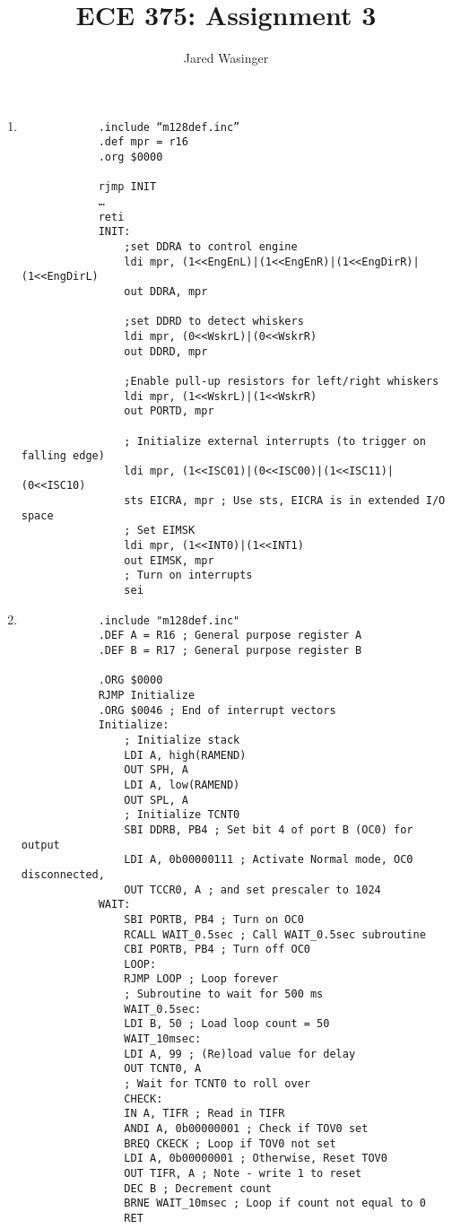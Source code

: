 \documentclass{article}
\begin{document}
  \title{ECE 375: Assignment 3}
  \author{Jared Wasinger}

  \maketitle

  \begin{enumerate}
		\item\begin{verbatim}
			.include “m128def.inc”
			.def mpr = r16
			.org $0000

			rjmp INIT
			…
			reti
			INIT: 
				;set DDRA to control engine
				ldi mpr, (1<<EngEnL)|(1<<EngEnR)|(1<<EngDirR)|(1<<EngDirL)
				out DDRA, mpr 

				;set DDRD to detect whiskers
				ldi mpr, (0<<WskrL)|(0<<WskrR)
				out DDRD, mpr 

				;Enable pull-up resistors for left/right whiskers
				ldi mpr, (1<<WskrL)|(1<<WskrR)
				out PORTD, mpr 

				; Initialize external interrupts (to trigger on falling edge)
				ldi mpr, (1<<ISC01)|(0<<ISC00)|(1<<ISC11)|(0<<ISC10)
				sts EICRA, mpr ; Use sts, EICRA is in extended I/O space
				; Set EIMSK
				ldi mpr, (1<<INT0)|(1<<INT1)
				out EIMSK, mpr
				; Turn on interrupts
				sei
		\end{verbatim}

		\item\begin{verbatim}
			.include "m128def.inc"
			.DEF A = R16 ; General purpose register A
			.DEF B = R17 ; General purpose register B

			.ORG $0000
			RJMP Initialize
			.ORG $0046 ; End of interrupt vectors
			Initialize:
				; Initialize stack
				LDI A, high(RAMEND)
				OUT SPH, A
				LDI A, low(RAMEND)
				OUT SPL, A
				; Initialize TCNT0
				SBI DDRB, PB4 ; Set bit 4 of port B (OC0) for output
				LDI A, 0b00000111 ; Activate Normal mode, OC0 disconnected,
				OUT TCCR0, A ; and set prescaler to 1024
			WAIT:
			 	SBI PORTB, PB4 ; Turn on OC0
				RCALL WAIT_0.5sec ; Call WAIT_0.5sec subroutine
				CBI PORTB, PB4 ; Turn off OC0
				LOOP:
				RJMP LOOP ; Loop forever
				; Subroutine to wait for 500 ms
				WAIT_0.5sec:
				LDI B, 50 ; Load loop count = 50
				WAIT_10msec:
				LDI A, 99 ; (Re)load value for delay
				OUT TCNT0, A
				; Wait for TCNT0 to roll over
				CHECK:
				IN A, TIFR ; Read in TIFR
				ANDI A, 0b00000001 ; Check if TOV0 set
				BREQ CKECK ; Loop if TOV0 not set
				LDI A, 0b00000001 ; Otherwise, Reset TOV0
				OUT TIFR, A ; Note - write 1 to reset
				DEC B ; Decrement count
				BRNE WAIT_10msec ; Loop if count not equal to 0
			 	RET
		\end{verbatim}
  \end{enumerate}
\end{document}
